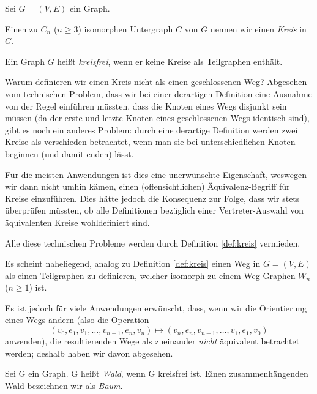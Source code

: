 \documentclass[10p,a4paper,BCOR = 12mm, DIV=15]{scrbook}
\begin{document}
\begin{Def}
\label{def:kreis}
Sei $G=(V, E)$ ein Graph.

Einen zu $C_n$ ($n \geq 3$) isomorphen Untergraph $C$ von $G$ nennen wir einen \emph{Kreis} in $G$.

Ein Graph $G$ heißt \emph{kreisfrei}, wenn er keine Kreise als Teilgraphen enthält.
\end{Def}

\begin{Bem}
Warum definieren wir einen Kreis nicht als einen geschlossenen Weg? Abgesehen vom technischen Problem, dass wir bei einer derartigen Definition eine Ausnahme von der Regel einführen müssten, dass die Knoten eines Wegs disjunkt sein müssen (da der erste und letzte Knoten eines geschlossenen Wegs identisch sind), gibt es noch ein anderes Problem: durch eine derartige Definition werden zwei Kreise als verschieden betrachtet, wenn man sie bei unterschiedlichen Knoten beginnen (und damit enden) lässt.

Für die meisten Anwendungen ist dies eine unerwünschte Eigenschaft, weswegen wir dann nicht umhin kämen, einen (offensichtlichen) Äquivalenz-Begriff für Kreise einzuführen. Dies hätte jedoch die Konsequenz zur Folge, dass wir stets überprüfen müssten, ob alle Definitionen bezüglich einer Vertreter-Auswahl von äquivalenten Kreise wohldefiniert sind.

Alle diese technischen Probleme werden durch Definition \ref{def:kreis} vermieden.
\end{Bem}

\begin{Bem}
Es scheint naheliegend, analog zu Definition \ref{def:kreis} einen Weg in $G=(V, E)$ als einen Teilgraphen zu definieren, welcher isomorph zu einem Weg-Graphen $W_n$ ($n \geq 1$) ist.

Es ist jedoch für viele Anwendungen erwünscht, dass, wenn wir die Orientierung eines Wegs ändern (also die Operation
\begin{displaymath}
\left(v_0, e_1, v_1, \ldots, v_{n-1}, e_n, v_n\right) \mapsto \left(v_n, e_n, v_{n-1}, \ldots, v_1, e_1, v_0\right)
\end{displaymath}
anwenden), die resultierenden Wege als zueinander \emph{nicht} äquivalent betrachtet werden; deshalb haben wir davon abgesehen.
\end{Bem}

\begin{Def}
Sei G ein Graph. G heißt \emph{Wald}, wenn G kreisfrei ist. Einen zusammenhängenden Wald bezeichnen wir als \emph{Baum}.
\end{Def}
\end{document}
